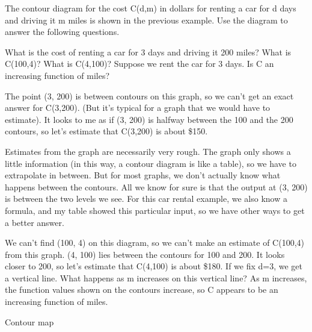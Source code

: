 \begin{example}
The contour diagram for the cost C(d,m) in dollars for renting a car for d days and driving it m miles is shown in the previous example. Use the diagram to answer the following questions.

What is the cost of renting a car for 3 days and driving it 200 miles?
What is C(100,4)? What is C(4,100)?
Suppose we rent the car for 3 days. Is C an increasing function of miles?

\begin{solution}
  The point (3, 200) is between contours on this graph, so we can’t get an exact answer for C(3,200). (But it’s typical for a graph that we would have to estimate). It looks to me as if (3, 200) is halfway between the 100 and the 200 contours, so let's estimate that C(3,200) is about \$150.

Estimates from the graph are necessarily very rough. The graph only shows a little information (in this way, a contour diagram is like a table), so we have to extrapolate in between. But for most graphs, we don’t actually know what happens between the contours. All we know for sure is that the output at (3, 200) is between the two levels we see. For this car rental example, we also know a formula, and my table showed this particular input, so we have other ways to get a better answer.

We can't find (100, 4) on this diagram, so we can't make an estimate of C(100,4) from this graph. (4, 100) lies between the contours for 100 and 200. It looks closer to 200, so let's estimate that C(4,100) is about \$180.
If we fix d=3, we get a vertical line. What happens as m increases on this vertical line? As m increases, the function values shown on the contours increase, so C appears to be an increasing function of miles.

Contour map
\end{solution}\end{example}

